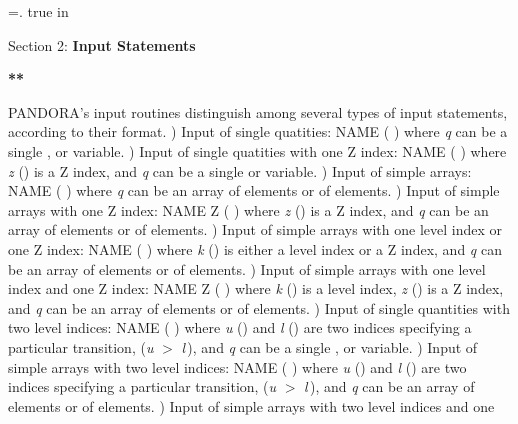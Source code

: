 %
\newtoks\footline \footline={\hss{}.\folio\hss}
\top
{} true in
\centerline{Section 2: {\bf Input Statements}}
\blankline
\blankline
\centerline{\bf ***}
\blankline
\blankline
PANDORA's input routines distinguish among several types of input
statements, according to their format.
\blankline
\blankline
{}) Input of single quatities:
\space
NAME \quad (  \quad ) 
\space
where {\it q} can be a single {\intg}, {\flpt} or {\alfa} variable.
\blankline
\blankline    
{}) Input of single quatities with one Z index:
\space
NAME  \quad (  \quad )
\space
where {\it z} (\intg) is a Z index, and {\it q} can be a single
{\intg} or {\flpt} variable.
\blankline
\blankline
{}) Input of simple arrays:
\space
NAME \quad (  \quad )
\space
where {\it q} can be an array of {\intg} elements or of {\flpt} elements.
\blankline
\blankline
{}) Input of simple arrays with one Z index:
\space
NAME \quad Z  \quad (  \quad )
\space
where {\it z} (\intg) is a Z index, and {\it q} can be an array of {\intg}
elements or of {\flpt} elements.
\ej
{}) Input of simple arrays with one level index or one Z index:
\space
NAME  \quad (  \quad )
\space
where {\it k} (\intg) is either a level index or a Z index,
and {\it q} can be an array of {\intg}
elements or of {\flpt} elements.
\blankline
\blankline
{}) Input of simple arrays with one level index and one Z index:
\space
NAME  \quad Z  \quad (  \quad )
\space
where {\it k} (\intg) is a level index, {\it z} (\intg) is a Z index, and {\it q}
can be an array of {\intg} elements or of {\flpt} elements.
\blankline
\blankline
{}) Input of single quantities with two level indices:
\space
NAME   \quad (  \quad )
\space
where {\it u} (\intg) and {\it l} (\intg) are two indices specifying a particular
transition, ({\it u} $>$ {\it l}$\,$), and {\it q} can be a single {\intg},
{\flpt} or {\alfa} variable.
\blankline
\blankline
{}) Input of simple arrays with two level indices:
\space
NAME   \quad (  \quad )
\space
where {\it u} (\intg) and {\it l} (\intg) are two indices specifying a particular
transition, ({\it u} $>$ {\it l}$\,$), and {\it q} can be an array of {\intg}
elements or of {\flpt} elements.
\blankline
\blankline
{}) Input of simple arrays with two level indices and one
